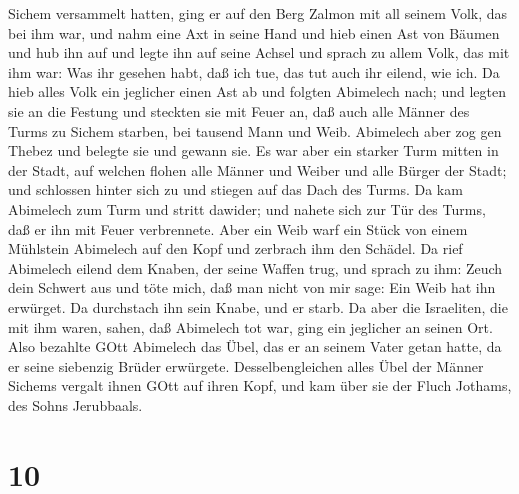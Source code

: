 Sichem versammelt hatten,  ging er auf den Berg Zalmon mit
all seinem Volk, das bei ihm war, und nahm eine Axt in seine Hand und
hieb einen Ast von Bäumen und hub ihn auf und legte ihn auf seine Achsel
und sprach zu allem Volk, das mit ihm war: Was ihr gesehen habt, daß ich
tue, das tut auch ihr eilend, wie ich.  Da hieb alles Volk
ein jeglicher einen Ast ab und folgten Abimelech nach; und legten sie an
die Festung und steckten sie mit Feuer an, daß auch alle Männer des
Turms zu Sichem starben, bei tausend Mann und Weib. 
Abimelech aber zog gen Thebez und belegte sie und gewann sie.
 Es war aber ein starker Turm mitten in der Stadt, auf
welchen flohen alle Männer und Weiber und alle Bürger der Stadt; und
schlossen hinter sich zu und stiegen auf das Dach des Turms.
 Da kam Abimelech zum Turm und stritt dawider; und nahete
sich zur Tür des Turms, daß er ihn mit Feuer verbrennete. 
Aber ein Weib warf ein Stück von einem Mühlstein Abimelech auf den Kopf
und zerbrach ihm den Schädel.  Da rief Abimelech eilend dem
Knaben, der seine Waffen trug, und sprach zu ihm: Zeuch dein Schwert aus
und töte mich, daß man nicht von mir sage: Ein Weib hat ihn erwürget. Da
durchstach ihn sein Knabe, und er starb.  Da aber die
Israeliten, die mit ihm waren, sahen, daß Abimelech tot war, ging ein
jeglicher an seinen Ort.  Also bezahlte GOtt Abimelech das
Übel, das er an seinem Vater getan hatte, da er seine siebenzig Brüder
erwürgete.  Desselbengleichen alles Übel der Männer Sichems
vergalt ihnen GOtt auf ihren Kopf, und kam über sie der Fluch Jothams,
des Sohns Jerubbaals.

\hypertarget{section-9}{%
\section{10}\label{section-9}}

